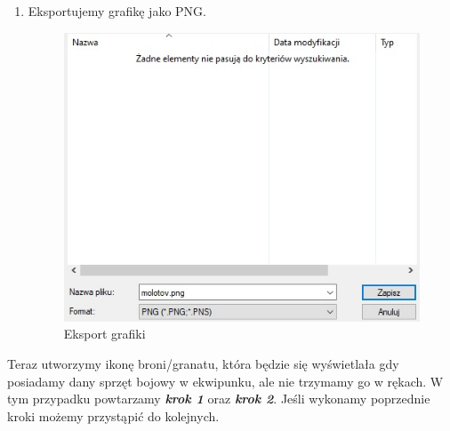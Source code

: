 \begin{enumerate}
  \item Eksportujemy grafikę jako PNG.
\begin{figure}[h]
    \centering
    \includegraphics[scale=0.7]{Images/Saving.jpg}
    \caption{Eksport grafiki}
    \label{fig:visBuglist}
\end{figure}
\FloatBarrier
\end{enumerate}

Teraz utworzymy ikonę broni/granatu, która będzie się wyświetlała gdy posiadamy dany sprzęt bojowy w ekwipunku, ale nie trzymamy go w rękach. W tym przypadku powtarzamy \textbf{\textit{krok 1}} oraz \textbf{\textit{krok 2}}. Jeśli wykonamy poprzednie kroki możemy przystąpić do kolejnych.

